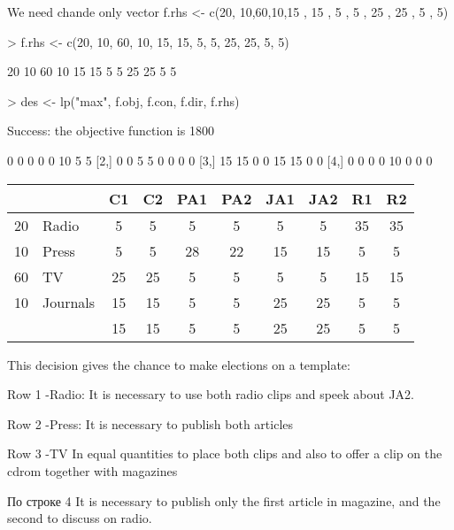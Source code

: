 \documentclass[a4paper,11pt]{scrartcl}
\begin{document}
We need  chande   only vector 
f.rhs <- c(20, 10,60,10,15 , 15  ,  5 , 5 , 25 , 25 , 5 , 5)
\begin{Schunk}
\begin{Sinput}
> f.rhs <- c(20, 10, 60, 10, 15, 15, 5, 5, 25, 25, 5, 5)
\end{Sinput}
\begin{Soutput}
 [1] 20 10 60 10 15 15  5  5 25 25  5  5
\end{Soutput}
\begin{Sinput}
> des <- lp("max", f.obj, f.con, f.dir, f.rhs)
\end{Sinput}
\begin{Soutput}
Success: the objective function is 1800 
\end{Soutput}
\begin{Soutput}
     [,1] [,2] [,3] [,4] [,5] [,6] [,7] [,8]
[1,]    0    0    0    0    0   10    5    5
[2,]    0    0    5    5    0    0    0    0
[3,]   15   15    0    0   15   15    0    0
[4,]    0    0    0    0   10    0    0    0
\end{Soutput}
\end{Schunk}
 \begin{tabular}{|l|l |c| c| c| c| c| c| c| c|}
\hline
&      &  C1 & C2  &  PA1 & PA2 & JA1 & JA2 & R1 & R2\\
\hline
20&Radio &  5 & 5  &  5 & 5 & 5 & 5 & 35 & 35\\
\hline
10&Press &  5 & 5  &  28 & 22 &  15 & 15 & 5 & 5\\
\hline
60&TV &  25 & 25  &  5 & 5 & 5 & 5 & 15 & 15\\
\hline
10&Journals &  15 & 15  &  5 & 5 & 25 & 25 & 5 & 5\\
\hline
& &  15 & 15  &  5 & 5 & 25 & 25 & 5 & 5\\
\hline
\end{tabular}

This decision gives the chance to make elections on a template:

Row 1 -Radio:
It is necessary to use both radio clips and speek about JA2. 

Row 2 -Press: 
It is necessary to publish both articles

Row 3 -TV In equal quantities to place both clips and also to offer a clip on the  cdrom together with magazines

По строке 4 
It is necessary to publish only the first article in magazine, and the second to discuss on radio.
\end{document}
